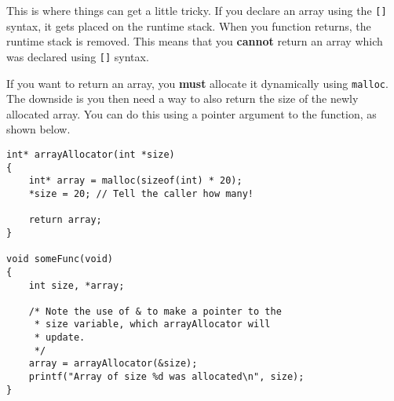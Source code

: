 This is where things can get a little tricky.
If you declare an array using the \texttt{[]} syntax, it gets placed on the runtime stack.
When you function returns, the runtime stack is removed.
This means that you \textbf{cannot} return an array which was declared using \texttt{[]} syntax.

If you want to return an array, you \textbf{must} allocate it dynamically using \texttt{malloc}.
The downside is you then need a way to also return the size of the newly allocated array.
You can do this using a pointer argument to the function, as shown below.

\begin{lstlisting}
int* arrayAllocator(int *size)
{
    int* array = malloc(sizeof(int) * 20);
    *size = 20; // Tell the caller how many!

    return array;
}

void someFunc(void)
{
    int size, *array;

    /* Note the use of & to make a pointer to the
     * size variable, which arrayAllocator will
     * update.
     */
    array = arrayAllocator(&size);
    printf("Array of size %d was allocated\n", size);
}
\end{lstlisting}
